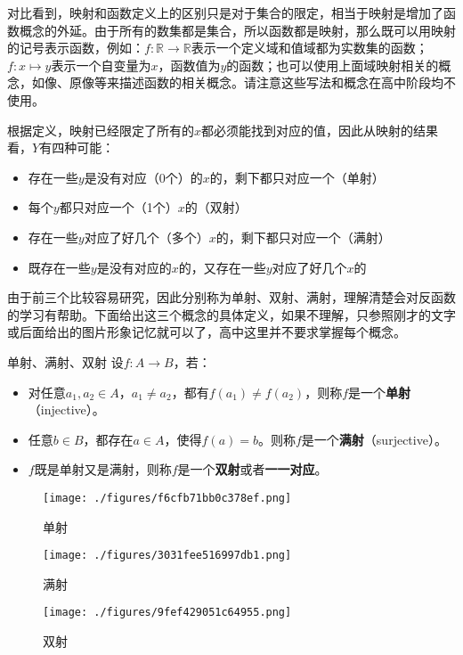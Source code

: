 对比看到，映射和函数定义上的区别只是对于集合的限定，相当于映射是增加了函数概念的外延。由于所有的数集都是集合，所以函数都是映射，那么既可以用映射的记号表示函数，例如：$f: \mathbb R \to \mathbb R$表示一个定义域和值域都为实数集的函数；$f:x \mapsto y$表示一个自变量为$x$，函数值为$y$的函数；也可以使用上面域映射相关的概念，如像、原像等来描述函数的相关概念。请注意这些写法和概念在高中阶段均不使用。

根据定义，映射已经限定了所有的$x$都必须能找到对应的值，因此从映射的结果看，$Y$有四种可能：
\begin{itemize}
\item 存在一些$y$是没有对应（0个）的$x$的，剩下都只对应一个（单射）
\item 每个$y$都只对应一个（1个）$x$的（双射）
\item 存在一些$y$对应了好几个（多个）$x$的，剩下都只对应一个（满射）
\item 既存在一些$y$是没有对应的$x$的，又存在一些$y$对应了好几个$x$的
\end{itemize}

由于前三个比较容易研究，因此分别称为单射、双射、满射，理解清楚会对反函数的学习有帮助。下面给出这三个概念的具体定义，如果不理解，只参照刚才的文字或后面给出的图片形象记忆就可以了，高中这里并不要求掌握每个概念。

\begin{definition}{单射、满射、双射}
设$f:A\to{B}$，若：
\begin{itemize}
\item 对任意$a_1,a_2\in{A}$，$a_1\not={a_2}$，都有$f(a_1)\not={f(a_2)}$，则称$f$是一个\textbf{单射}（injective）。
\item 任意$b\in{B}$，都存在$a\in{A}$，使得$f(a)=b$。则称$f$是一个\textbf{满射}（surjective）。
\item $f$既是单射又是满射，则称$f$是一个\textbf{双射}或者\textbf{一一对应}。
\end{itemize}
\end{definition}

\begin{figure}[ht]
\centering
\texttt{[image: ./figures/f6cfb71bb0c378ef.png]}
\caption{单射}\label{fig_functi_2}
\end{figure}
\begin{figure}[ht]
\centering
\texttt{[image: ./figures/3031fee516997db1.png]}
\caption{满射} \label{fig_functi_3}
\end{figure}
\begin{figure}[ht]
\centering
\texttt{[image: ./figures/9fef429051c64955.png]}
\caption{双射} \label{fig_functi_4}
\end{figure}

